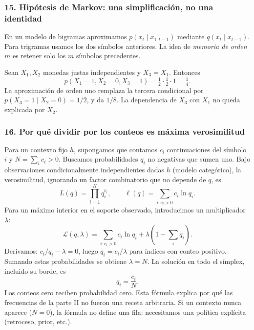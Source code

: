 \subsubsection*{15. Hipótesis de Markov: una simplificación, no una identidad}
En un modelo de bigramas aproximamos $p(x_t\mid x_{1:t-1})$ mediante $q(x_t\mid x_{t-1})$. Para trigramas usamos los dos símbolos anteriores. La idea de \emph{memoria de orden $m$} es retener solo los $m$ símbolos precedentes.
\begin{center}
\end{center}
\begin{ejemplo}
Sean $X_1,X_2$ monedas justas independientes y $X_3=X_1$. Entonces
\[
p(X_1=1,X_2=0,X_3=1)=\tfrac12\cdot\tfrac12\cdot1=\tfrac14.
\]
La aproximación de orden uno remplaza la tercera condicional por $p(X_3=1\mid X_2=0)=1/2$, y da $1/8$. La dependencia de $X_3$ con $X_1$ no queda explicada por $X_2$.
\end{ejemplo}

\subsubsection*{16. Por qué dividir por los conteos es máxima verosimilitud}
Para un contexto fijo $h$, supongamos que contamos $c_i$ continuaciones del símbolo $i$ y $N=\sum_i c_i>0$. Buscamos probabilidades $q_i$ no negativas que sumen uno. Bajo observaciones condicionalmente independientes dadas $h$ (modelo categórico), la verosimilitud, ignorando un factor combinatorio que no depende de $q$, es
\[
L(q)=\prod_{i=1}^{K} q_i^{c_i},\qquad
\ell(q)=\sum_{i:c_i>0} c_i\ln q_i.
\]
Para un máximo interior en el soporte observado, introducimos un multiplicador $\lambda$:
\[
\mathcal L(q,\lambda)=\sum_{i:c_i>0}c_i\ln q_i+\lambda(1-\sum_iq_i).
\]
Derivamos: $c_i/q_i-\lambda=0$, luego $q_i=c_i/\lambda$ para índices con conteo positivo. Sumando estas probabilidades se obtiene $\lambda=N$. La solución en todo el símplex, incluido su borde, es
\[
\boxed{\widehat q_i=\frac{c_i}{N}.}
\]
Los conteos cero reciben probabilidad cero. Esta fórmula explica por qué las frecuencias de la parte II no fueron una receta arbitraria. Si un contexto nunca aparece ($N=0$), la fórmula no define una fila: necesitamos una política explícita (retroceso, prior, etc.).

